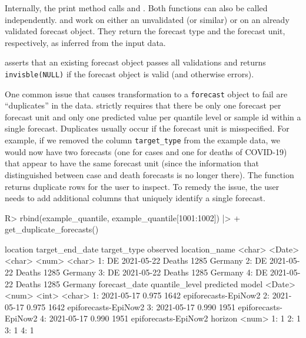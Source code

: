 \documentclass[
]{jss}
\begin{document}
Internally, the print method calls  and
. Both functions can also be called
independently.  and
 work on either an unvalidated
 (or similar) or on an already validated forecast
object. They return the forecast type and the forecast unit,
respectively, as inferred from the input data.

 asserts that an existing forecast object
passes all validations and returns \texttt{invisble(NULL)} if the
forecast object is valid (and otherwise errors).

One common issue that causes transformation to a \texttt{forecast}
object to fail are ``duplicates'' in the data. 
strictly requires that there be only one forecast per forecast unit and
only one predicted value per quantile level or sample id within a single
forecast. Duplicates usually occur if the forecast unit is misspecified.
For example, if we removed the column \texttt{target\_type} from the
example data, we would now have two forecasts (one for cases and one for
deaths of COVID-19) that appear to have the same forecast unit (since
the information that distinguished between case and death forecasts is
no longer there). The function 
returns duplicate rows for the user to inspect. To remedy the issue, the
user needs to add additional columns that uniquely identify a single
forecast.

\begin{CodeChunk}
\begin{CodeInput}
R> rbind(example_quantile, example_quantile[1001:1002]) |>
+   get_duplicate_forecasts() 
\end{CodeInput}
\begin{CodeOutput}
   location target_end_date target_type observed location_name
     <char>          <Date>      <char>    <num>        <char>
1:       DE      2021-05-22      Deaths     1285       Germany
2:       DE      2021-05-22      Deaths     1285       Germany
3:       DE      2021-05-22      Deaths     1285       Germany
4:       DE      2021-05-22      Deaths     1285       Germany
   forecast_date quantile_level predicted                model
          <Date>          <num>     <int>               <char>
1:    2021-05-17          0.975      1642 epiforecasts-EpiNow2
2:    2021-05-17          0.975      1642 epiforecasts-EpiNow2
3:    2021-05-17          0.990      1951 epiforecasts-EpiNow2
4:    2021-05-17          0.990      1951 epiforecasts-EpiNow2
   horizon
     <num>
1:       1
2:       1
3:       1
4:       1
\end{CodeOutput}
\end{CodeChunk}
\end{document}
